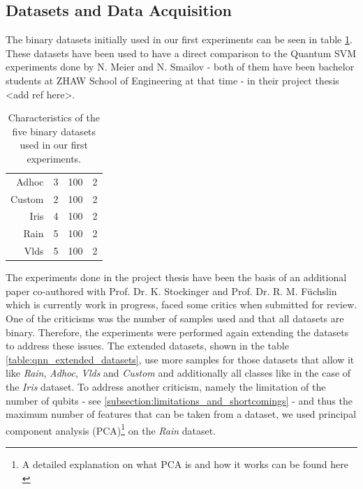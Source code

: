\subsection{Datasets and Data Acquisition}
\label{subsection:qnn_datasets_and_acqusition}
The binary datasets initially used in our first experiments can be seen in table \ref{table:qnn_binary_datasets}. These datasets have been used to have a direct comparison to the Quantum SVM experiments done by N. Meier and N. Smailov - both of them have been bachelor students at ZHAW School of Engineering at that time - in their project thesis <add ref here>. 

\begin{table}[!h]
	\centering
	\begin{tabular}{rccc}
		\hline 
		\thead{\textbf{Dataset}} & \thead{\textbf{\#Features}} & \thead{\textbf{\#Records}} & \thead{\textbf{\#Classes}} \\
		\hline 
		Adhoc   & 3         & 100      & 2        \\
		Custom  & 2         & 100      & 2        \\
		Iris    & 4         & 100      & 2        \\
		Rain    & 5         & 100      & 2        \\
		Vlds    & 5         & 100      & 2        \\
		\hline
	\end{tabular}
	\caption{Characteristics of the five binary datasets used in our first experiments.}
	\label{table:qnn_binary_datasets}
\end{table}

The experiments done in the project thesis have been the basis of an additional paper co-authored with Prof. Dr. K. Stockinger and Prof. Dr. R. M. Füchslin which is currently work in progress, faced some critics when submitted for review. 
One of the criticisms was the number of samples used and that all datasets are binary. Therefore, the experiments were performed again extending the datasets to address these issues. The extended datasets, shown in the table \ref{table:qnn_extended_datasets}, use more samples for those datasets that allow it like \textit{Rain}, \textit{Adhoc}, \textit{Vlds} and \textit{Custom} and additionally all classes like in the case of the \textit{Iris} dataset. To address another criticism, namely the limitation of the number of qubits - see \ref{subsection:limitations_and_shortcomings} - and thus the maximum number of features that can be taken from a dataset, we used principal component analysis (PCA)\footnote{A detailed explanation on what PCA is and how it works can be found here \cite{bro2014principal}} on the \textit{Rain} dataset.

